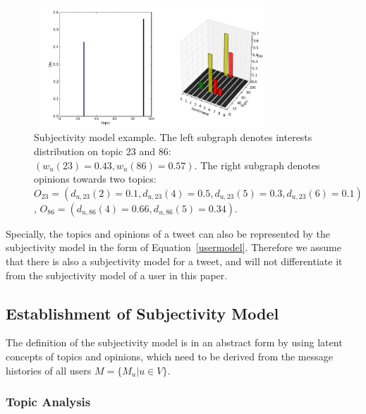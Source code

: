 \documentclass[letterpaper]{article}
\begin{document}
\begin{figure}[t]
\includegraphics[width=3.5in,height=1.8in]{fig1.pdf}
\caption{Subjectivity model example. The left subgraph denotes interests distribution on topic 23 and 86: $ ( w_{u}\left( 23 \right)=0.43, w_{u}\left( 86 \right)=0.57)  $. The right subgraph denotes opinions towards two topics: $ O_{23}=( d_{u,23} \left( 2 \right)=0.1, d_{u,23} \left( 4 \right)=0.5,d_{u,23} \left( 5 \right)=0.3,d_{u,23} \left( 6 \right)=0.1) $, $ O_{86}=( d_{u,86} \left( 4 \right)=0.66, d_{u,86} \left( 5 \right)=0.34 ) $.}
\label{fig0}
\end{figure}

Specially, the topics and opinions of a tweet can also be represented by the subjectivity model in the form of  Equation~\ref{usermodel}. Therefore we assume that there is also a subjectivity model for a tweet, and will not differentiate it from the subjectivity model of a user in this paper. 
 
\subsection{Establishment of Subjectivity Model}
\label{establishment}

The definition of the subjectivity model is in an abstract form by using latent concepts of topics and opinions,  which need to be derived from the message histories of all users $ M=\lbrace M_{u}\vert u \in V\rbrace$.

\subsubsection{Topic Analysis}
\label{topic}
\end{document}

